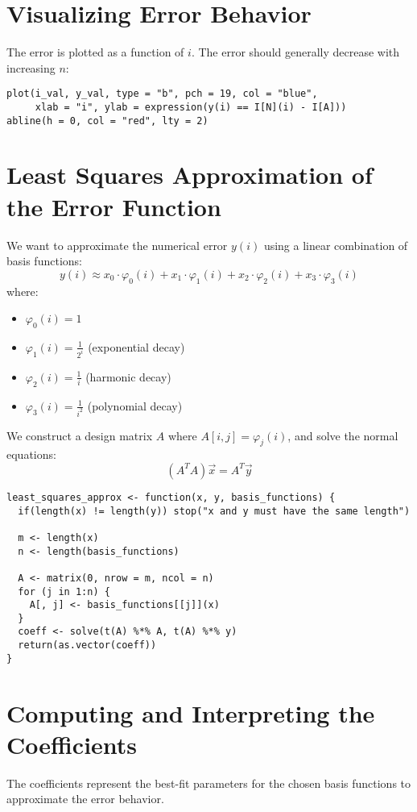 \documentclass[a4paper,12pt]{article}
\begin{document}
\section{Visualizing Error Behavior}
The error is plotted as a function of $i$. The error should generally decrease with increasing $n$:

\begin{lstlisting}[caption=Plot the numerical error]
plot(i_val, y_val, type = "b", pch = 19, col = "blue",
     xlab = "i", ylab = expression(y(i) == I[N](i) - I[A]))
abline(h = 0, col = "red", lty = 2)
\end{lstlisting}
\newpage
\section{Least Squares Approximation of the Error Function}
We want to approximate the numerical error $y(i)$ using a linear combination of basis functions:
\[ y(i) \approx x_0 \cdot \varphi_0(i) + x_1 \cdot \varphi_1(i) + x_2 \cdot \varphi_2(i) + x_3 \cdot \varphi_3(i) \]
where:
\begin{itemize}
  \item $\varphi_0(i) = 1$
  \item $\varphi_1(i) = \frac{1}{2^i}$ (exponential decay)
  \item $\varphi_2(i) = \frac{1}{i}$ (harmonic decay)
  \item $\varphi_3(i) = \frac{1}{i^2}$ (polynomial decay)
\end{itemize}

We construct a design matrix $A$ where $A[i,j] = \varphi_j(i)$, and solve the normal equations:
\[ (A^T A)\vec{x} = A^T \vec{y} \]

\begin{lstlisting}[caption=Least squares approximation function]
least_squares_approx <- function(x, y, basis_functions) {
  if(length(x) != length(y)) stop("x and y must have the same length")

  m <- length(x)
  n <- length(basis_functions)

  A <- matrix(0, nrow = m, ncol = n)
  for (j in 1:n) {
    A[, j] <- basis_functions[[j]](x)
  }
  coeff <- solve(t(A) %*% A, t(A) %*% y)
  return(as.vector(coeff))
}
\end{lstlisting}

\section{Computing and Interpreting the Coefficients}
The coefficients represent the best-fit parameters for the chosen basis functions to approximate the error behavior.
\end{document}
